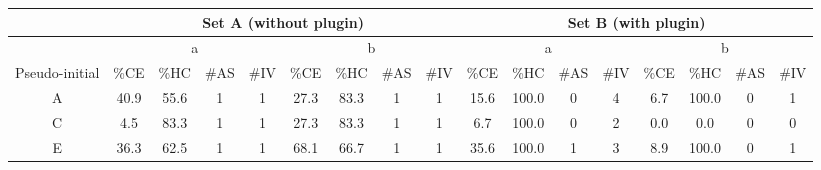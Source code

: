 \begin{landscape}
\begin{table}[p]
  \begin{tabular}{@{}ccccccccccccccccc@{}}
    \toprule
    \multicolumn{1}{l}{}                & \multicolumn{8}{c}{Set A (without plugin)}                                                                                                                  & \multicolumn{8}{c}{Set B (with plugin)}                                                                                                                                                            \\ \midrule
    \multicolumn{1}{c|}{}               & \multicolumn{4}{c|}{a}                         & \multicolumn{4}{c|}{b}                                                                                     & \multicolumn{4}{c|}{a}                                                                 & \multicolumn{4}{c}{b}                                                                                     \\ \midrule
    \multicolumn{1}{c|}{Pseudo-initial} & \%CE & \%HC & \#AS & \multicolumn{1}{l|}{\#IV} & \multicolumn{1}{l}{\%CE} & \multicolumn{1}{l}{\%HC} & \multicolumn{1}{l}{\#AS} & \multicolumn{1}{l|}{\#IV} & \%CE & \multicolumn{1}{l}{\%HC} & \multicolumn{1}{l}{\#AS} & \multicolumn{1}{l|}{\#IV} & \multicolumn{1}{l}{\%CE} & \multicolumn{1}{l}{\%HC} & \multicolumn{1}{l}{\#AS} & \multicolumn{1}{l}{\#IV} \\ \midrule
    \multicolumn{1}{c|}{A}              & 40.9 & 55.6 & 1    & \multicolumn{1}{c|}{1}    & 27.3                     & 83.3                     & 1                        & \multicolumn{1}{c|}{1}    & 15.6 & 100.0                    & 0                        & \multicolumn{1}{c|}{4}    & 6.7                      & 100.0                    & 0                        & 1                        \\
    \multicolumn{1}{c|}{C}              & 4.5  & 83.3 & 1    & \multicolumn{1}{c|}{1}    & 27.3                     & 83.3                     & 1                        & \multicolumn{1}{c|}{1}    & 6.7  & 100.0                    & 0                        & \multicolumn{1}{c|}{2}    & 0.0                      & 0.0                      & 0                        & 0                        \\
    \multicolumn{1}{c|}{E}              & 36.3 & 62.5 & 1    & \multicolumn{1}{c|}{1}    & 68.1                     & 66.7                     & 1                        & \multicolumn{1}{c|}{1}    & 35.6 & 100.0                    & 1                        & \multicolumn{1}{c|}{3}    & 8.9                      & 100.0                    & 0                        & 1                        \\

\end{tabular}
\end{table}
\end{landscape}
